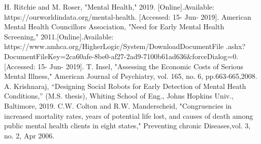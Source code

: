 \documentclass[letterpaper, 10 pt, conference]{ieeeconf}  %
\begin{document}









\newpage
\begin{thebibliography}{99}

 H. Ritchie and M. Roser, "Mental Health," 2019. [Online].Available: https://ourworldindata.org/mental-health. [Accessed: 15- Jun- 2019]. 
 American Mental Health Councillors Association, "Need for Early Mental Health Screening," 2011.[Online].Available: https://www.amhca.org/HigherLogic/System/DownloadDocumentFile .ashx?DocumentFileKey=2ca60afe-8be0-af27-2ad9-7100b61ad636&forceDialog=0. [Accessed: 15- Jun- 2019]. 
 T. Insel, "Assessing the Economic Costs of Serious Mental Illness," American Journal of Psychiatry, vol. 165, no. 6, pp.663-665,2008.
 A. Krishnaraj, “Designing Social Robots for Early Detection of Mental Heath Conditions,” (M.S. thesis), Whiting School of Eng., Johns Hopkins Univ., Baltimore, 2019.
 C.W. Colton and R.W. Manderscheid, "Congruencies in increased mortality rates, years of potential life lost, and causes of death among public mental health clients in eight states," Preventing chronic Diseases,vol. 3, no. 2,    Apr 2006. 
\end{thebibliography}
\end{document}
